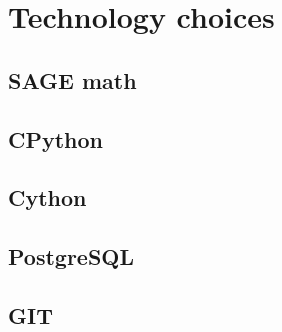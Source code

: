 \chapter{Technology choices}
  \section{SAGE math}
  \section{CPython}
  \section{Cython}
  \section{PostgreSQL}
  \section{GIT}
